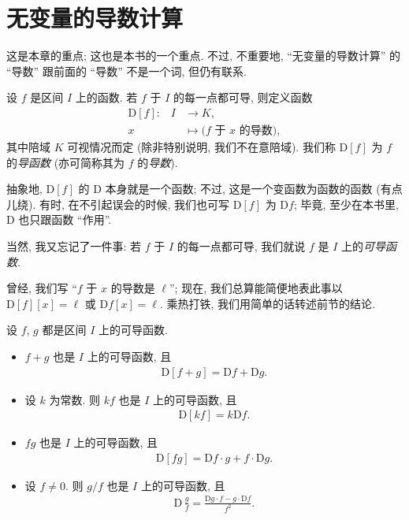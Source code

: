 \section{无变量的导数计算}

这是本章的重点; 这也是本书的一个重点. 不过, 不重要地, ``无变量的导数计算'' 的 ``导数'' 跟前面的 ``导数'' 不是一个词, 但仍有联系.

\begin{definition}
    设 $f$ 是区间 $I$ 上的函数. 若 $f$ 于 $I$ 的每一点都可导, 则定义函数
    \begin{align*}
        \text{$\mathrm{D}[f]$:} \quad
        I & \to K,                              \\
        x & \mapsto \text{($f$ 于 $x$ 的导数)},
    \end{align*}
    其中陪域 $K$ 可视情况而定 (除非特别说明, 我们不在意陪域). 我们称 $\mathrm{D}[f]$ 为 $f$ 的\emph{导函数} (亦可简称其为 $f$ 的\emph{导数}).
\end{definition}

抽象地, $\mathrm{D}[f]$ 的 $\mathrm{D}$ 本身就是一个函数; 不过, 这是一个变函数为函数的函数 (有点儿绕). 有时, 在不引起误会的时候, 我们也可写 $\mathrm{D}[f]$ 为 $\mathrm{D}f$; 毕竟, 至少在本书里, $\mathrm{D}$ 也只跟函数 ``作用''.

当然, 我又忘记了一件事: 若 $f$ 于 $I$ 的每一点都可导, 我们就说 $f$ 是 $I$ 上的\emph{可导函数}.

曾经, 我们写 ``$f$ 于 $x$ 的导数是 $\ell$''; 现在, 我们总算能简便地表此事以 $\mathrm{D}[f][x] = \ell$ 或 $\mathrm{D}f[x] = \ell$. 乘热打铁, 我们用简单的话转述前节的结论.

\begin{theorem}
    设 $f$, $g$ 都是区间 $I$ 上的可导函数.
    \begin{itemize}
        \item $f + g$ 也是 $I$ 上的可导函数, 且
              \begin{align*}
                  \mathrm{D} [f + g] = \mathrm{D} f + \mathrm{D} g.
              \end{align*}
        \item 设 $k$ 为常数. 则 $kf$ 也是 $I$ 上的可导函数, 且
              \begin{align*}
                  \mathrm{D} [kf] = k\mathrm{D} f.
              \end{align*}
        \item $fg$ 也是 $I$ 上的可导函数, 且
              \begin{align*}
                  \mathrm{D} [fg] = \mathrm{D} f \cdot g + f \cdot \mathrm{D} g.
              \end{align*}
        \item 设 $f \neq 0$. 则 $g/f$ 也是 $I$ 上的可导函数, 且
              \begin{align*}
                  \mathrm{D}\, \frac{g}{f} = \frac{\mathrm{D} g \cdot f - g \cdot \mathrm{D} f}{f^2}.
              \end{align*}
    \end{itemize}
\end{theorem}

